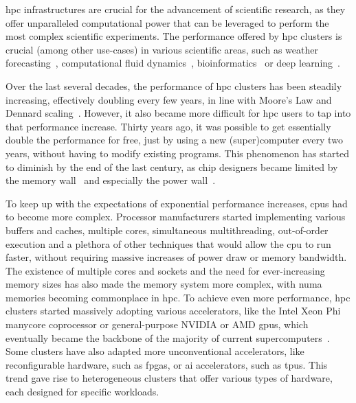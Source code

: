 \gls{hpc} infrastructures are crucial for the advancement of scientific
research, as they offer unparalleled computational power that can be leveraged to perform the most
complex scientific experiments. The performance offered by \gls{hpc} clusters is
crucial (among other use-cases) in various scientific areas, such as weather
forecasting~\cite{wrf}, computational fluid dynamics~\cite{cfd},
bioinformatics~\cite{bioinformatics} or deep learning~\cite{hpcdl}.

Over the last several decades, the performance of \gls{hpc} clusters has been steadily
increasing, effectively doubling every few years, in line with Moore's Law and Dennard
scaling~\cite{mooreslaw}. However, it also became more difficult for \gls{hpc}
users to tap into that performance increase. Thirty years ago, it was possible to get essentially
double the performance for free, just by using a new (super)computer every two years, without
having to modify existing programs. This phenomenon has started to diminish by the end of the last
century, as chip designers became limited by the memory wall~\cite{memorywall} and especially
the power wall~\cite{powerwall}.

To keep up with the expectations of exponential performance increases, \glspl{cpu} had
to become more complex. Processor manufacturers started implementing various buffers and caches,
multiple cores, simultaneous multithreading, out-of-order execution and a plethora of other
techniques that would allow the \gls{cpu} to run faster, without requiring massive
increases of power draw or memory bandwidth. The existence of multiple cores and sockets and the
need for ever-increasing memory sizes has also made the memory system more complex, with
\gls{numa} memories becoming commonplace in \gls{hpc}. To achieve even
more performance, \gls{hpc} clusters started massively adopting various accelerators,
like the Intel Xeon Phi~\cite{xeonphi} manycore coprocessor or general-purpose
NVIDIA or AMD \glspl{gpu}, which eventually became the backbone of the majority of
current supercomputers~\cite{top500gpu}. Some clusters have also adapted more unconventional
accelerators, like reconfigurable hardware, such as \glspl{fpga}, or
\gls{ai} accelerators, such as \glspl{tpu}. This trend gave rise to
heterogeneous clusters that offer various types of hardware, each designed for specific workloads.

